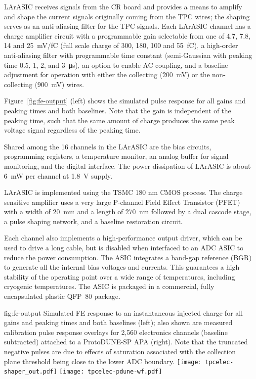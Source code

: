 LArASIC receives signals from the CR board and
provides a means to amplify and shape the current signals originally coming from the TPC wires; the
shaping serves as an anti-aliasing filter for the TPC signals.
Each LArASIC channel has a charge amplifier circuit with a programmable
gain selectable from one of 4.7, 7.8, 14 and 25~mV/fC
(full scale charge of 300, 180, 100 and 55~fC),
a high-order anti-aliasing filter with programmable time
constant (semi-Gaussian with peaking time 0.5, 1, 2, and 3~\si{\micro\second}),
an option to enable AC coupling,
and a baseline adjustment for operation with either the collecting (200~mV) or the non-collecting (900~mV) wires.

Figure~\ref{fig:fe-output} (left) shows the simulated pulse response for all gains and peaking times and both baselines.
Note that the gain is independent of the peaking time, such that the same amount of charge produces the same peak voltage signal regardless of the peaking time.  

Shared among the 16 channels in the LArASIC are the bias circuits, programming registers,
a temperature monitor, an analog buffer for signal monitoring, and the digital interface.
The power dissipation of LArASIC is about 6~mW per channel at 1.8~V supply.

LArASIC is implemented using the TSMC 180 nm CMOS process.  The charge sensitive amplifier uses a very large P-channel Field Effect Transistor (PFET) with a width of 20~mm and a length of 270~nm followed by a dual cascode stage, a pulse shaping network, and a baseline restoration circuit.  

Each channel also implements a high-performance output driver,
which can be used to drive a long cable, but is disabled when interfaced to an ADC ASIC to reduce the power consumption.
The ASIC integrates a band-gap reference (BGR) to generate all the internal bias voltages and currents.
This guarantees a high stability of the operating point over a wide range of
temperatures, including cryogenic temperatures.
The ASIC is packaged in a commercial, fully encapsulated plastic QFP~80 package.

\begin{dunefigure}
{fig:fe-output}
{Simulated FE response to an instantaneous injected charge for all gains and peaking times and both baselines (left); also shown are measured calibration pulse response overlays for 2,560 electronics channels (baseline subtracted) attached to a ProtoDUNE-SP APA (right).  Note that the truncated negative pulses are due to effects of saturation associated with the collection plane threshold being close to the lower ADC boundary.}
\texttt{[image: tpcelec-shaper\_out.pdf]}
\texttt{[image: tpcelec-pdune-wf.pdf]}
\end{dunefigure}

